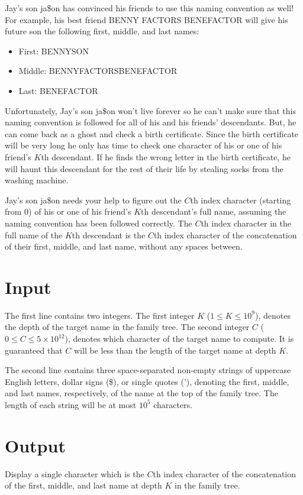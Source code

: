 Jay's son ja\$on has convinced his friends to use this naming convention as well!
For example, his best friend BENNY FACTORS BENEFACTOR will give his future son
the following first, middle, and last names:

\begin{itemize}
\item First: BENNYSON
\item Middle: BENNYFACTORSBENEFACTOR
\item Last: BENEFACTOR
\end{itemize}

Unfortunately, Jay's son ja\$on won't live forever so he can't make sure that
this naming convention is followed for all of his and his friends' descendants. But, he can come
back as a ghost and check a birth certificate. Since the birth certificate
will be very long he only has time to check one character of his or one of his friend's $K$th
descendant. If he finds the wrong letter in the birth certificate, he will haunt
this descendant for the rest of their life by stealing socks from the washing
machine.



Jay's son ja\$on needs your help to figure out the $C$th index character
(starting from 0) of his or one of his friend's $K$th descendant's full name, assuming the naming
convention has been followed correctly. The $C$th
index character in the full name of the $K$th descendant is the $C$th index
character of the concatenation of their first, middle, and last name, without
any spaces between.


\section*{Input}

The first line contains two integers. The first integer $K$ ($1 \leq K
\leq 10^9$), denotes the depth of the target name in the family tree. The second
integer $C$ ($0 \leq C \leq 5\times 10^{12}$), denotes which character of the target
name to compute. It is guaranteed that $C$ will be less than the length of the
target name at depth $K$.

The second line contains three space-separated non-empty strings of uppercase
English letters, dollar signs (\$), or single quotes ('), denoting the first,
middle, and last names, respectively, of the name at the top of the family tree.
The length of each string will be at most $10^5$ characters.


\section*{Output}

Display a single character which is the $C$th index character of the
concatenation of the first, middle, and last name at depth $K$ in the family
tree.
